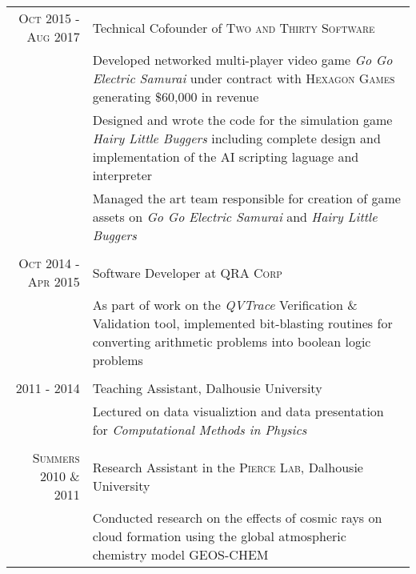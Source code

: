 \documentclass[a4paper,11pt]{article} %
\begin{document}
\begin{tabular}{r|p{11cm}}

\textsc{Oct 2015 - Aug 2017} & Technical Cofounder of \textsc{Two and Thirty Software} \\
& \footnotesize{ Developed networked multi-player video game \emph{Go Go Electric Samurai} under contract with \textsc{Hexagon Games} generating \$60,000 in revenue} \\
& \footnotesize{ Designed and wrote the code for the simulation game \emph{Hairy Little Buggers} including complete design and implementation of the AI scripting laguage and interpreter } \\
& \footnotesize{ Managed the art team responsible for creation of game assets on \emph{Go Go Electric Samurai} and \emph{Hairy Little Buggers} } \\
\multicolumn{2}{c}{} \\

\textsc{Oct 2014 - Apr 2015} & Software Developer at \textsc{QRA Corp}\\
& \footnotesize{ As part of work on the \emph{QVTrace} Verification \& Validation tool, implemented bit-blasting routines for converting arithmetic problems into boolean logic problems } \\
\multicolumn{2}{c}{} \\

\textsc{ 2011 - 2014 } & Teaching Assistant, Dalhousie University \\
& \footnotesize { Lectured on data visualiztion and data presentation for \emph{Computational Methods in Physics} } \\
\multicolumn{2}{c}{} \\

\textsc{Summers 2010 \& 2011} & Research Assistant in the \textsc{Pierce Lab}, Dalhousie University  \\
& \footnotesize{ Conducted research on the effects of cosmic rays on cloud formation using the global atmospheric chemistry model GEOS-CHEM } \\


\end{tabular}
\end{document}
